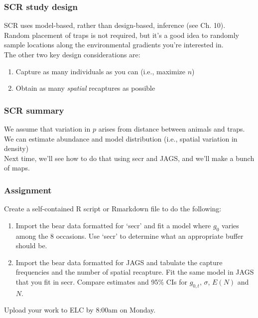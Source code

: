 \documentclass[color=usenames,dvipsnames]{beamer}\usepackage[]{graphicx}\usepackage[]{xcolor}
\begin{document}
\begin{frame}
  \frametitle{SCR study design}
  SCR uses model-based, rather than design-based,
  inference (see Ch. 10). \\ 
  \pause
  \vfill
  Random placement of traps is not required, but it's a good idea to
  randomly sample locations along the environmental gradients you're
  interested in. \\
  \pause \vfill
  The other two key design considerations are:
  \begin{enumerate}
    \item<3-> Capture as many individuals as you can (i.e., maximize $n$)
    \item<4-> Obtain as many {\it spatial} recaptures as possible
  \end{enumerate}
  \vfill
\end{frame}



\begin{frame}
  \frametitle{SCR summary}
  We assume that variation in $p$ arises from distance between animals
  and traps. \\
  \pause \vfill
  We can estimate abundance and model distribution (i.e., spatial
  variation in density) \\
  \pause \vfill
  Next time, we'll see how to do that using secr and JAGS, and we'll
  make a bunch of maps. \\
\end{frame}








\begin{frame}[fragile]
  \frametitle{Assignment}
  Create a self-contained R script or Rmarkdown file to do the
  following: 
  \vfill
  \begin{enumerate}
    \item Import the bear data formatted for `secr' and fit a model
      where $g_0$ varies among the 8 occasions. Use `secr' to
      determine what an appropriate buffer should be.
    \item Import the bear data formatted for JAGS and tabulate the
      capture frequencies and the number of spatial recapture. Fit the
      same model in JAGS that you fit in secr. Compare estimates and 95\% CIs
      for $g_{0,t}$, $\sigma$, $E(N)$ and $N$.  
  \end{enumerate}
  \vfill
  Upload your work to ELC by 8:00am on Monday. 
\end{frame}
\end{document}
